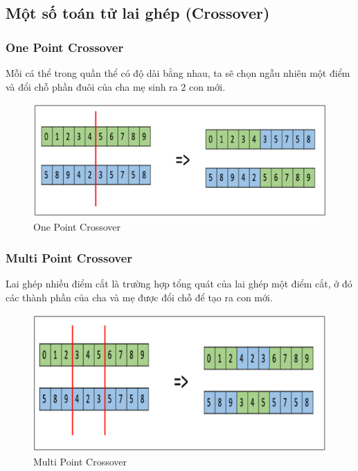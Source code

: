 \documentclass[a4paper,12pt]{report}
\begin{document}
\subsection{Một số toán tử lai ghép (Crossover)}
\subsubsection{One Point Crossover}
Mỗi cá thể trong quần thể có độ dài bằng nhau, ta sẽ chọn ngẫu nhiên một điểm và đổi chỗ phần đuôi của cha mẹ sinh ra 2 con mới. 
\begin{figure}[H]
\centering
\includegraphics[scale=0.4]{one_point_crossover.png}
\caption{One Point Crossover}
\end{figure}

\subsubsection{Multi Point Crossover}
Lai ghép nhiều điểm cắt là trường hợp tổng quát của lai ghép một điểm cắt, ở đó các thành phần của cha và mẹ được đổi chỗ để tạo ra con mới.
\begin{figure}[H]
\centering
\includegraphics[scale=0.4]{multi_point_crossover.png}
\caption{Multi Point Crossover}
\end{figure}
\end{document}
